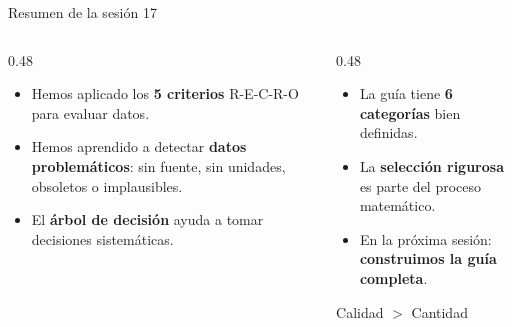 \documentclass[aspectratio=169, 10pt, spanish]{beamer}
\begin{document}
\begin{frame}{Resumen de la sesión 17}
  \begin{resumenbox}
    \begin{columns}[t]
      \begin{column}{0.48\textwidth}
        \begin{itemize}
          \item Hemos aplicado los \textbf{5 criterios} R-E-C-R-O para evaluar datos.
          \item Hemos aprendido a detectar \textbf{datos problemáticos}: sin fuente, sin unidades, obsoletos o implausibles.
          \item El \textbf{árbol de decisión} ayuda a tomar decisiones sistemáticas.
        \end{itemize}
      \end{column}
      \begin{column}{0.48\textwidth}
        \begin{itemize}
          \item La guía tiene \textbf{6 categorías} bien definidas.
          \item La \textbf{selección rigurosa} es parte del proceso matemático.
          \item En la próxima sesión: \textbf{construimos la guía completa}.
        \end{itemize}
        \vspace{0.3cm}
        \begin{formulabox}[BCrear]
          Calidad $>$ Cantidad
        \end{formulabox}
      \end{column}
    \end{columns}
  \end{resumenbox}
\end{frame}
\end{document}
